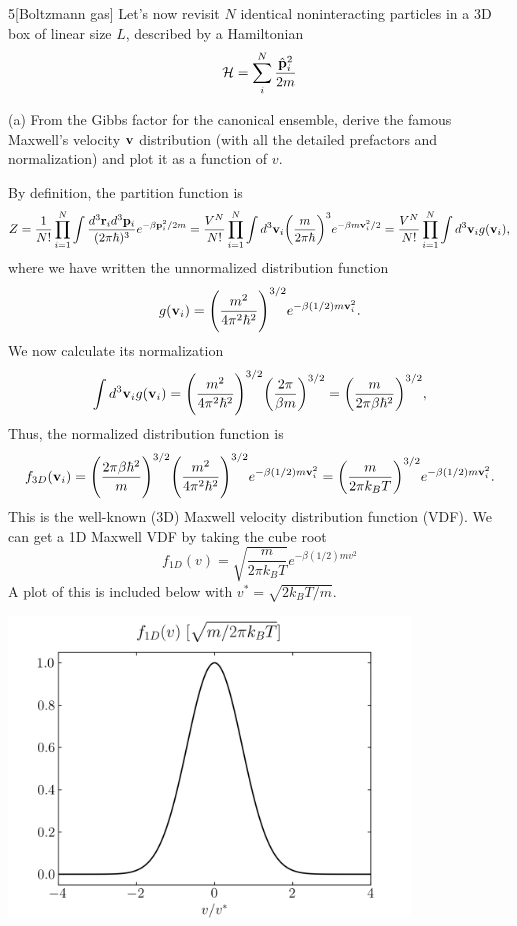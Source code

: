 \documentclass[12pt]{article}
\begin{document}
\begin{problem}{5}[Boltzmann gas]
Let's now revisit $N$ identical noninteracting particles in a 3D box of linear
size $L$, described by a Hamiltonian
\begin{equation}
    \mathcal{H}=\sum_i^N\frac{\hat{\vb{p}}_i^2}{2m} 
\end{equation}

(a) From the Gibbs factor for the canonical ensemble, derive the famous
Maxwell's velocity $\vb{v}$ distribution (with all the detailed prefactors and
normalization) and plot it as a function of $v$.

\begin{solution}
By definition, the partition function is
\begin{align}
    Z=\frac1{N!}\prod_{i=1}^N\int\frac{d^3\vb{r}_id^3\vb{p}_i}{(2\pi\hbar)^3}
    e^{-\beta \vb{p}_i^2/2m}
    =\frac{V^N}{N!}\prod_{i=1}^N\int
    d^3\vb{v}_i\qty(\frac{m}{2\pi\hbar})^3e^{-\beta m\vb{v}_i^2/2}
    =\frac{V^N}{N!}\prod_{i=1}^N
    \int d^3\vb{v}_ig(\vb{v}_i),
\end{align}
where we have written the unnormalized distribution function
\begin{equation}
    g(\vb{v}_i)=\qty(\frac{m^2}{4\pi^2\hbar^2})^{3/2}e^{-\beta (1/2)m\vb{v}_i^2}.
\end{equation}
We now calculate its normalization
\begin{equation}
    \int d^3\vb{v}_ig(\vb{v}_i)
    =\qty(\frac{m^2}{4\pi^2\hbar^2})^{3/2}\qty(\frac{2\pi}{\beta m})^{3/2}
    =\qty(\frac{m}{2\pi\beta\hbar^2})^{3/2},
\end{equation}
Thus, the normalized distribution function is
\begin{equation}
    f_{3D}(\vb{v}_i)=\qty(\frac{2\pi\beta\hbar^2}{m})^{3/2}\qty(\frac{m^2}{4\pi^2\hbar^2})^{3/2}e^{-\beta(1/2)m\vb{v}_i^2}
    =\qty(\frac{m}{2\pi k_BT})^{3/2}e^{-\beta(1/2)m\vb{v}_i^2}.
\end{equation}
This is the well-known (3D) Maxwell velocity distribution function (VDF). We 
can get a 1D Maxwell VDF by taking the cube root
\begin{equation}
    f_{1D}(v)=\sqrt{\frac{m}{2\pi k_BT}}e^{-\beta(1/2)mv^2} 
\end{equation}
A plot of this is included below with $v^\ast=\sqrt{2k_BT/m}$.
\begin{center}
    \includegraphics[width=0.8\textwidth]{p5a.png} 
\end{center}


\end{solution}
\end{problem}
\end{document}
